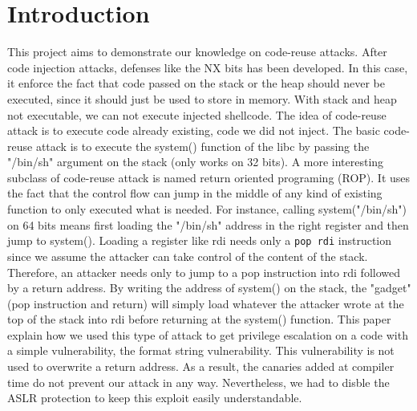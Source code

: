 \section{Introduction}
This project aims to demonstrate our knowledge on code-reuse attacks. After code injection attacks, defenses like the NX bits has been developed. In this case, it enforce the fact that code passed on the stack or the heap should never be executed, since it should just be used to store in memory. With stack and heap not executable, we can not execute injected shellcode. The idea of code-reuse attack is to execute code already existing, code we did not inject. The basic code-reuse attack is to execute the system() function of the libc by passing the "/bin/sh" argument on the stack (only works on 32 bits). A more interesting subclass of code-reuse attack is named return oriented programing (ROP). It uses the fact that the control flow can jump in the middle of any kind of existing function to only executed what is needed. For instance, calling system("/bin/sh") on 64 bits means first loading the "/bin/sh" address in the right register and then jump to system(). Loading a register like rdi needs only a {\tt pop rdi} instruction since we assume the attacker can take control of the content of the stack. Therefore, an attacker needs only to jump to a pop instruction into rdi followed by a return address. By writing the address of system() on the stack, the "gadget" (pop instruction and return) will simply load whatever the attacker wrote at the top of the stack into rdi before returning at the system() function.
This paper explain how we used this type of attack to get privilege escalation on a code with a simple vulnerability, the format string vulnerability. This vulnerability is not used to overwrite a return address. As a result, the canaries added at compiler time do not prevent our attack in any way. Nevertheless, we had to disble the ASLR protection to keep this exploit easily understandable.
